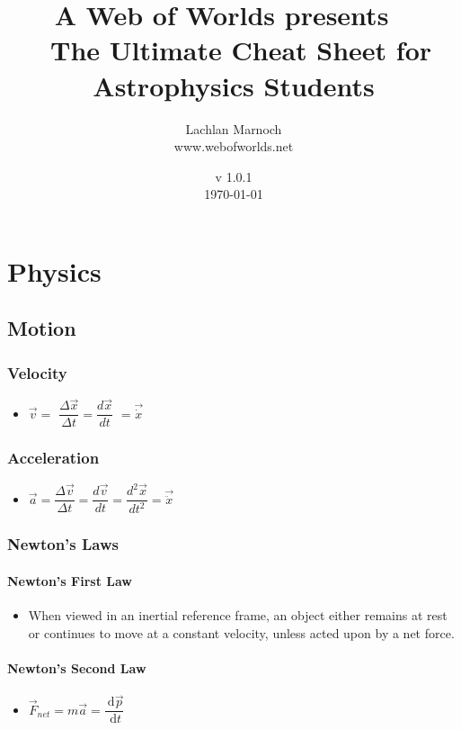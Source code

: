 \documentclass[]{report}
\title{{\large A Web of Worlds presents} \ \\\ The Ultimate Cheat Sheet for Astrophysics Students}
\date{v 1.0.1 \\ \today}
\author{Lachlan Marnoch \\ www.webofworlds.net}
\newcommand \tab[1][1cm]{\hspace*{#1}}
\newcommand{\dn}[1]{\ \mathrm{d}#1}
\newcommand{\dd}[2]{ \dfrac{\dn #1}{\dn #2}}
\newcommand{\itemt}{\item \tab}
\begin{document}
\maketitle

\tableofcontents


\chapter{Physics}

	\section{Motion}

\subsection{Velocity}

\begin{itemize}
\itemt \( \vec{v} = \) \( \dfrac{\Delta \vec{x}}{\Delta t} = \dfrac{d \vec{x}}{dt} \) \(= \vec{\dot{x}}  \)
\end{itemize}

\subsection{Acceleration}

\begin{itemize}
\itemt \( \vec{a} = \dfrac{\Delta \vec{v}}{\Delta t} = \dfrac{d \vec{v}}{dt} = \dfrac{d^2 \vec{x}}{dt^2} = \vec{\ddot{x}}  \)	
\end{itemize}            
		
\subsection{Newton's Laws}

\subsubsection{Newton's First Law}
\begin{itemize}
\item When viewed in an inertial reference frame, an object either remains at rest or continues to move at a constant velocity, unless acted upon by a net force.
\end{itemize}

\subsubsection{Newton's Second Law}
\begin{itemize}
\itemt \(\vec{F}_{net} = m\vec{a} = \dd{\vec{p}}{t}	\)
\end{itemize}
\end{document}
